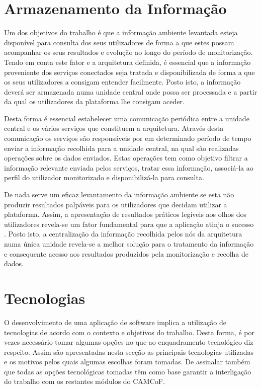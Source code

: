 \section{Armazenamento da Informação}

Um dos objetivos do trabalho é que a informação ambiente levantada esteja disponível para consulta dos seus utilizadores de forma a que estes possam acompanhar os seus resultados e evolução ao longo do período de monitorização. Tendo em conta este fator e a arquitetura definida, é essencial que a informação proveniente dos serviços conectados seja tratada e disponibilizada de forma a que os seus utilizadores a consigam entender facilmente. Posto isto, a informação deverá ser armazenada numa unidade central onde possa ser processada e a partir da qual os utilizadores da plataforma lhe consigam aceder.

Desta forma é essencial estabelecer uma comunicação periódica entre a unidade central e os vários serviços que constituem a arquitetura. Através desta comunicação os serviços são responsáveis por em determinado período de tempo enviar a informação recolhida para a unidade central, na qual são realizadas operações sobre os dados enviados. Estas operações tem como objetivo filtrar a informação relevante enviada pelos serviços, tratar essa informação, associá-la ao perfil do utilizador monitorizado e disponibilizá-la para consulta. 

De nada serve um eficaz levantamento da informação ambiente se esta não produzir resultados palpáveis para os utilizadores que decidam utilizar a plataforma. Assim, a apresentação de resultados práticos legíveis aos olhos dos utilizadores revela-se um fator fundamental para que a aplicação atinja o sucesso \cite{fernandes1995global}. Posto isto, a centralização da informação recolhida pelos nós da arquitetura numa única unidade revela-se a melhor solução para o tratamento da informação e consequente acesso aos resultados produzidos pela monitorização e recolha de dados.



\section{Tecnologias}

O desenvolvimento de uma aplicação de software implica a utilização de tecnologias de acordo com o contexto e objetivos do trabalho. Desta forma, é por vezes necessário tomar algumas opções no que ao enquadramento tecnológico diz respeito. Assim são apresentadas nesta secção as principais tecnologias utilizadas e os motivos pelos quais algumas escolhas foram tomadas. De assinalar também que todas as opções tecnológicas tomadas têm como base garantir a interligação do trabalho com os restantes módulos do CAMCoF.

